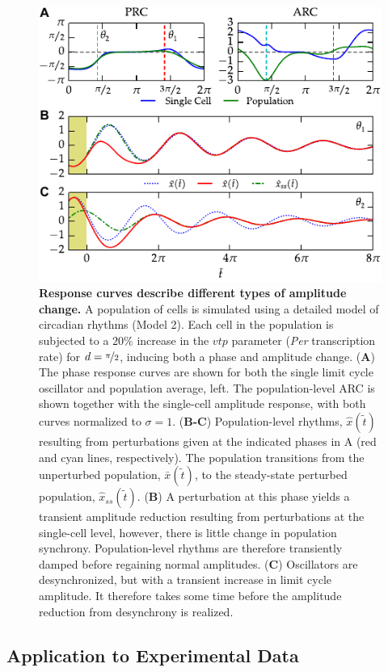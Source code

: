 \documentclass[11pt, letterpaper]{article}
\begin{document}
\begin{figure}[tbp]
  \begin{center}
    \includegraphics[width=.75\textwidth]{figures/figure_4.pdf}
    \caption{
{\bfseries Response curves describe different types of amplitude change.}
A population of cells is simulated using a detailed model of circadian rhythms (Model 2).
Each cell in the population is subjected to a $20\%$ increase in the $\mathit{vtp}$ parameter ({\itshape Per} transcription rate) for $d=\nicefrac{\pi}{2}$, inducing both a phase and amplitude change.
({\bfseries A}) The phase response curves are shown for both the single limit cycle oscillator and population average, left.
The population-level ARC is shown together with the single-cell amplitude response, with both curves normalized to $\sigma=1$.
({\bfseries B-C}) Population-level rhythms, $\hat{x}(\tilde{t})$ resulting from perturbations given at the indicated phases in A (red and cyan lines, respectively).
The population transitions from the unperturbed population, $\bar{x}(\tilde{t})$, to the steady-state perturbed population, $\hat{x}_{ss}(\tilde{t})$.
({\bfseries B}) A perturbation at this phase yields a transient amplitude reduction resulting from perturbations at the single-cell level, however, there is little change in population synchrony.
Population-level rhythms are therefore transiently damped before regaining normal amplitudes.
({\bfseries C}) Oscillators are desynchronized, but with a transient increase in limit cycle amplitude.
It therefore takes some time before the amplitude reduction from desynchrony is realized.}
  \end{center}
\end{figure}

\subsection*{Application to Experimental Data}
\end{document}
